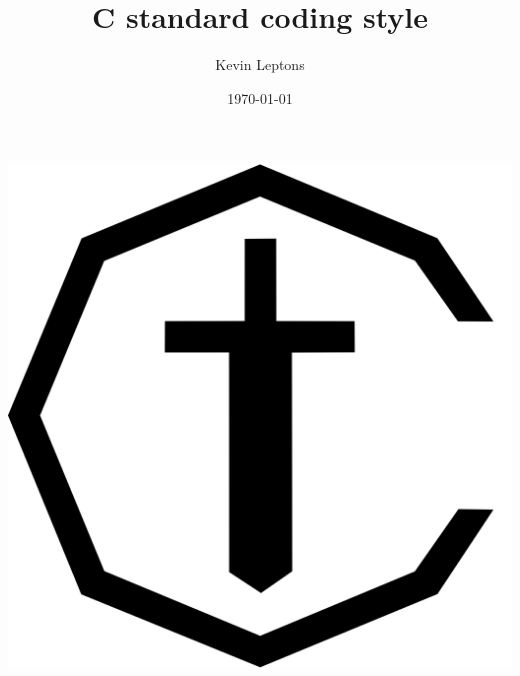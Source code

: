 \documentclass[11pt,twoside,a4paper]{book}
\title{C standard coding style}
\author{Kevin Leptons}
\date{\today}
\begin{document}
\includegraphics{img/cstyle.png}
\maketitle
\tableofcontents
















\end{document}

